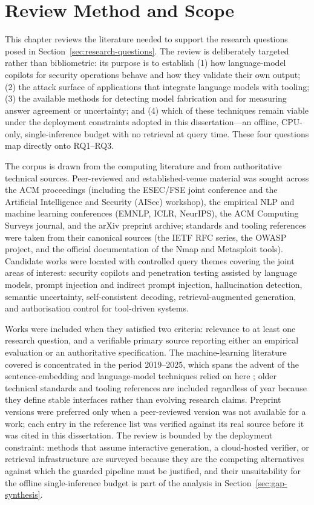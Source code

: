 \section{Review Method and Scope}\label{sec:review-method-and-scope}

This chapter reviews the literature needed to support the research questions
posed in Section~\ref{sec:research-questions}. The review is deliberately
targeted rather than bibliometric: its purpose is to establish (1) how
language-model copilots for security operations behave and how they validate
their own output; (2) the attack surface of applications that integrate
language models with tooling; (3) the available methods for detecting model
fabrication and for measuring answer agreement or uncertainty; and (4) which of
these techniques remain viable under the deployment constraints adopted in this
dissertation---an offline, CPU-only, single-inference budget with no retrieval
at query time. These four questions map directly onto RQ1--RQ3.

The corpus is drawn from the computing literature and from authoritative
technical sources. Peer-reviewed and established-venue material was sought
across the ACM proceedings (including the ESEC/FSE joint conference and the
Artificial Intelligence and Security (AISec) workshop), the empirical NLP and
machine learning conferences (EMNLP, ICLR, NeurIPS), the ACM Computing Surveys
journal, and the arXiv preprint archive; standards and tooling references were taken
from their canonical sources (the IETF RFC series, the OWASP project, and the
official documentation of the Nmap and Metasploit tools). Candidate works were
located with controlled query themes covering the joint areas of interest:
security copilots and penetration testing assisted by language models, prompt
injection and indirect prompt injection, hallucination detection, semantic
uncertainty, self-consistent decoding, retrieval-augmented generation, and
authorisation control for tool-driven systems.

Works were included when they satisfied two criteria: relevance to at least one
research question, and a verifiable primary source reporting either an empirical
evaluation or an authoritative specification. The machine-learning literature
covered is concentrated in the period 2019--2025, which spans the advent of the
sentence-embedding and language-model techniques relied on here
\parencite{reimers2019sbert,lewis2020rag}; older technical standards and
tooling references are included regardless of year because they define stable
interfaces rather than evolving research claims. Preprint versions were
preferred only when a peer-reviewed version was not available for a work; each
entry in the reference list was verified against its real source before it was
cited in this dissertation. The review is bounded by the deployment constraint:
methods that assume interactive generation, a cloud-hosted verifier, or
retrieval infrastructure are surveyed because they are the competing
alternatives against which the guarded pipeline must be justified, and their
unsuitability for the offline single-inference budget is part of the analysis
in Section~\ref{sec:gap-synthesis}.


